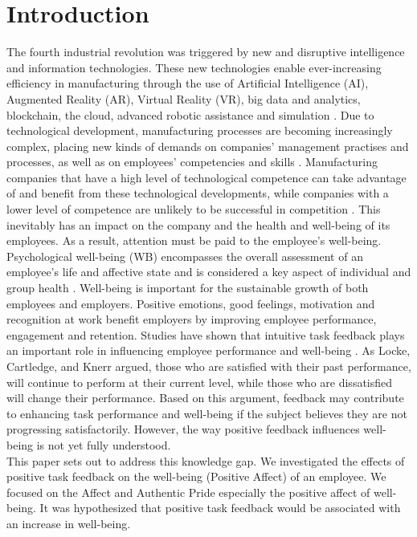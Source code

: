 \documentclass[conference]{IEEEtran}
\begin{document}
\section{Introduction}
	The fourth industrial revolution was triggered by new and disruptive intelligence and information technologies. These new technologies enable ever-increasing efficiency in manufacturing through the use of Artificial Intelligence (AI), Augmented Reality (AR), Virtual Reality (VR), big data and analytics, blockchain, the cloud, advanced robotic assistance and simulation \cite{b1}.  Due to technological development, manufacturing processes are becoming increasingly complex, placing new kinds of demands on companies' management practises and processes, as well as on employees' competencies and skills \cite{b3}\cite{b4}\cite{b5}. Manufacturing companies that have a high level of technological competence can take advantage of and benefit from these technological developments, while companies with a lower level of competence are unlikely to be successful in competition \cite{b2}. This inevitably has an impact on the company and the health and well-being of its employees. As a result, attention must be paid to the employee's well-being. Psychological well-being (WB) encompasses the overall assessment of an employee’s life and affective state and is considered a key aspect of individual and group health \cite{b6}. Well-being is important for the sustainable growth of both employees and employers. Positive emotions, good feelings, motivation and recognition at work benefit employers by improving employee performance, engagement and retention. Studies have shown that intuitive task feedback plays an important role in influencing employee performance and well-being \cite{b7}. As Locke, Cartledge, and Knerr \cite{b8} argued, those who are satisfied with their past performance, will continue to perform at their current level, while those who are dissatisfied will change their performance. Based on this argument, feedback may contribute to enhancing task performance and well-being if the subject believes they are not progressing satisfactorily. However, the way positive feedback influences well-being is not yet fully understood.\\
	This paper sets out to address this knowledge gap. We investigated the effects of positive task feedback on the well-being (Positive Affect) of an employee. We focused on the Affect and Authentic Pride	especially the positive affect of well-being. It was hypothesized that positive task feedback would be associated with an increase in well-being. 
\end{document}

